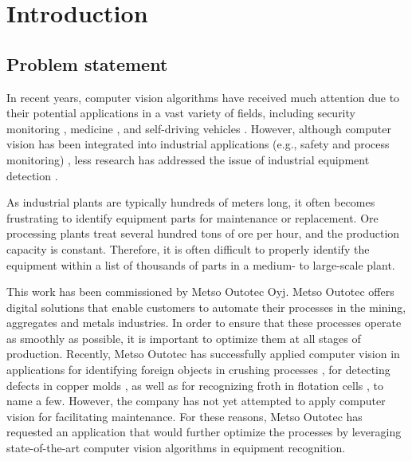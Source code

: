 \documentclass[english, 12pt, a4paper, elec, utf8, a-1b, online]{aaltothesis}
\begin{document}
\listoftodos
{}

\cleardoublepage

\section{Introduction}

\thispagestyle{empty}
\subsection{Problem statement}
In recent years, computer vision algorithms have received much attention due to their potential applications in a vast variety of fields, including security monitoring \cite{Awalgaonkar2020}, medicine \cite{9689485}, and self-driving vehicles \cite{Janai2017, Shan2018}. However, although computer vision has been integrated into industrial applications (e.g., safety and process monitoring) \cite{Awalgaonkar2020, Banf2022}, less research has addressed the issue of industrial equipment detection \cite{Wu2022, MALBURG2021581, Kim2020}. 

As industrial plants are typically hundreds of meters long, it often becomes frustrating to identify equipment parts for maintenance or replacement. Ore processing plants treat several hundred tons of ore per hour, and the production capacity is constant. Therefore, it is often difficult to properly identify the equipment within a list of thousands of parts in a medium- to large-scale plant.

This work has been commissioned by Metso Outotec Oyj.  Metso Outotec offers digital solutions that enable customers to automate their processes in the mining, aggregates and metals industries. In order to ensure that these processes operate as smoothly as possible, it is important to optimize them at all stages of production. Recently, Metso Outotec has successfully applied computer vision in applications for identifying foreign objects in crushing processes \cite{metso_outotec_2022}, for detecting defects in copper  molds \cite{metso_outotec_2022_2}, as well as for recognizing froth in flotation cells \cite{metso_outotec_2022_1}, to name a few. However, the company has not yet attempted to apply computer vision for facilitating maintenance. For these reasons, Metso Outotec has requested an application that would further optimize the processes by leveraging state-of-the-art computer vision algorithms in equipment recognition. 
\end{document}
